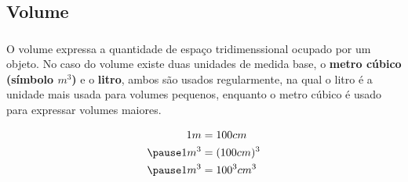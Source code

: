 \documentclass[handout]{beamer}
\begin{document}
\begin{frame}\frametitle{\subsecname}

    \begin{table}[H]
    \end{table}
\end{frame}


\subsection{Volume}

\begin{frame}\frametitle{\subsecname}
    O volume expressa
    a quantidade de espaço tridimenssional ocupado por um objeto. No caso do volume existe duas unidades de medida base,
    o \textbf{metro cúbico (símbolo $m^3$)} e o \textbf{litro}, ambos são usados regularmente, na qual o litro é a unidade mais usada para volumes
    pequenos, enquanto o metro cúbico é usado para expressar volumes maiores.

    \begin{align*}
        1m   & = 100cm     \\
        \pause
        1m^3 & = (100cm)^3 \\
        \pause
        1m^3 & = 100^3cm^3
    \end{align*}
\end{frame}
\end{document}
